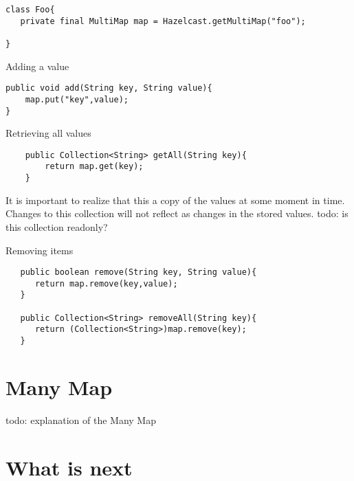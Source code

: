 \begin{verbatim}
class Foo{
   private final MultiMap map = Hazelcast.getMultiMap("foo");
	
}
\end{verbatim}

Adding a value

\begin{verbatim}
public void add(String key, String value){
	map.put("key",value);
}
\end{verbatim}

Retrieving all values

\begin{verbatim}
	public Collection<String> getAll(String key){
		return map.get(key);
	}
\end{verbatim}

It is important to realize that this a copy of the values at some moment in time. Changes to this collection will not reflect as changes in the stored values. todo: is this collection readonly?

Removing items

\begin{verbatim}
   public boolean remove(String key, String value){
      return map.remove(key,value);
   }

   public Collection<String> removeAll(String key){
      return (Collection<String>)map.remove(key);
   }
\end{verbatim}

\section{Many Map}

todo: explanation of the Many Map

\section{What is next}